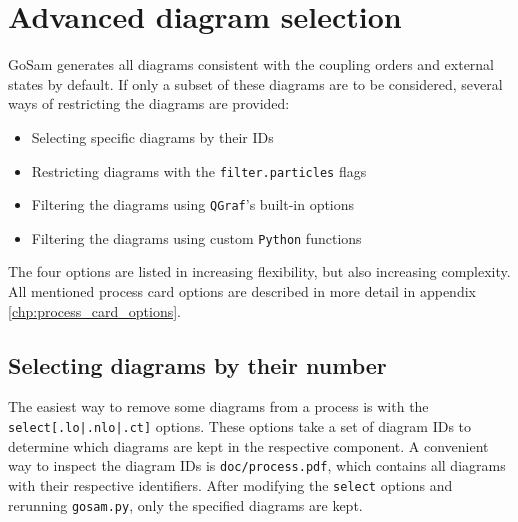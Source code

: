 \documentclass[11pt,a4paper]{refrep}
\newcommand{\gosam}{{\sc GoSam}\xspace}
\newcommand{\qgraf}{{\tt QGraf}\xspace}
\newcommand{\python}{{\tt Python}\xspace}
\begin{document}

\chapter{Advanced diagram selection}
\gosam generates all diagrams consistent with the coupling orders and external states by default. If only a subset of these diagrams are to be considered, several ways of restricting the diagrams are provided:
\begin{itemize}
   \item Selecting specific diagrams by their IDs
   \item Restricting diagrams with the \texttt{filter.particles} flags
   \item Filtering the diagrams using \qgraf's built-in options
   \item Filtering the diagrams using custom \python functions
\end{itemize}
The four options are listed in increasing flexibility, but also increasing complexity. All mentioned process card options are described in more detail in appendix \ref{chp:process_card_options}.

\section{Selecting diagrams by their number}
The easiest way to remove some diagrams from a process is with the \texttt{select[.lo|.nlo|.ct]} options. These options take a set of diagram IDs to determine which diagrams are kept in the respective component. A convenient way to inspect the diagram IDs is \texttt{doc/process.pdf}, which contains all diagrams with their respective identifiers. After modifying the \texttt{select} options and rerunning \texttt{gosam.py}, only the specified diagrams are kept. 
\end{document}
